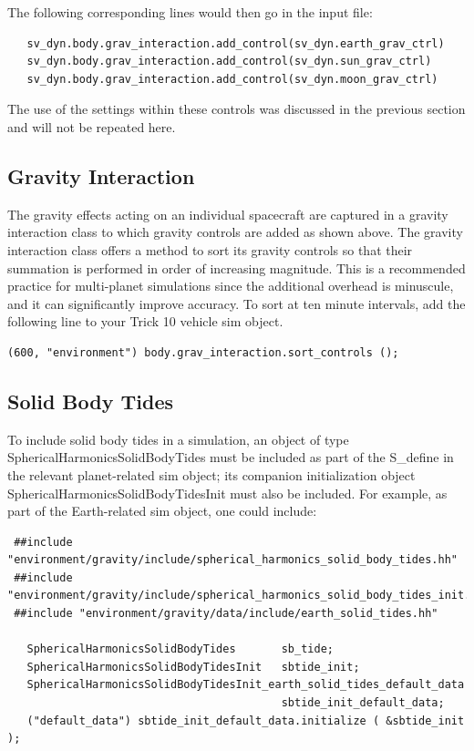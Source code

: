 The following corresponding lines would then go in the input file:
\begin{verbatim}
   sv_dyn.body.grav_interaction.add_control(sv_dyn.earth_grav_ctrl)
   sv_dyn.body.grav_interaction.add_control(sv_dyn.sun_grav_ctrl)
   sv_dyn.body.grav_interaction.add_control(sv_dyn.moon_grav_ctrl)
\end{verbatim}

The use of the settings within these controls was discussed in the previous
section and will not be repeated here.

\subsection{Gravity Interaction}
The gravity effects acting on an individual spacecraft are captured in a
gravity interaction class to which gravity controls are added as shown
above. The gravity interaction class offers a method to sort its gravity
controls so that their summation is performed in order of increasing magnitude.
This is a recommended practice for multi-planet simulations since the
additional overhead is minuscule, and it can significantly improve accuracy.
To sort at ten minute intervals, add the following line to your Trick 10
vehicle sim object.
\begin{verbatim}
(600, "environment") body.grav_interaction.sort_controls ();
\end{verbatim}

\subsection{Solid Body Tides}
To include solid body tides in a simulation, an object of type
SphericalHarmonicsSolidBodyTides must be included as part of the S\_define in
the relevant planet-related sim object; its companion initialization object
SphericalHarmonicsSolidBodyTidesInit must also be included.  For example, as
part of the Earth-related sim object, one could include:
\begin{verbatim}
 ##include "environment/gravity/include/spherical_harmonics_solid_body_tides.hh"
 ##include "environment/gravity/include/spherical_harmonics_solid_body_tides_init.hh"
 ##include "environment/gravity/data/include/earth_solid_tides.hh"

   SphericalHarmonicsSolidBodyTides       sb_tide;
   SphericalHarmonicsSolidBodyTidesInit   sbtide_init;
   SphericalHarmonicsSolidBodyTidesInit_earth_solid_tides_default_data
                                          sbtide_init_default_data;
   ("default_data") sbtide_init_default_data.initialize ( &sbtide_init );
\end{verbatim}

